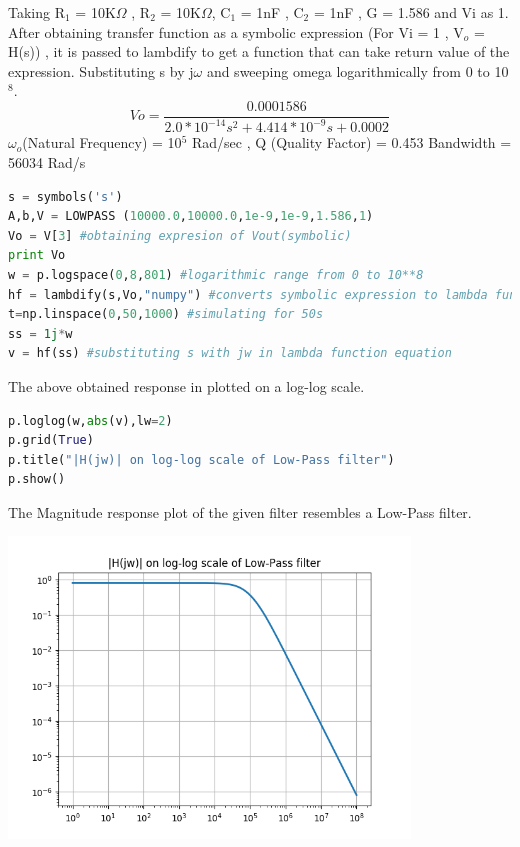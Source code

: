\documentclass[a4paper]{article}
\begin{document}
Taking R$_{1}$ = 10K$\Omega$ , R$_{2}$ = 10K$\Omega$, C$_{1}$ = 1nF , C$_{2}$ = 1nF , G = 1.586 and Vi as 1. After obtaining transfer function as a symbolic expression (For Vi = 1 , V$_{o}$ = H(s)) , it is passed to lambdify to get a function that can take return value of the expression. Substituting s by j$\omega$ and sweeping omega logarithmically from 0 to 10$^{8}$.
$$ Vo = \frac{0.0001586}{2.0*10^{-14}s^{2} + 4.414*10^{-9}s + 0.0002}$$
$\omega$$_{o}$(Natural Frequency) = 10$^{5}$ Rad/sec
, Q (Quality Factor) =  0.453
Bandwidth = 56034 Rad/s
\begin{lstlisting}[language=Python]
s = symbols('s')
A,b,V = LOWPASS	(10000.0,10000.0,1e-9,1e-9,1.586,1) 
Vo = V[3] #obtaining expresion of Vout(symbolic)
print Vo
w = p.logspace(0,8,801) #logarithmic range from 0 to 10**8
hf = lambdify(s,Vo,"numpy") #converts symbolic expression to lambda function
t=np.linspace(0,50,1000) #simulating for 50s
ss = 1j*w
v = hf(ss) #substituting s with jw in lambda function equation
\end{lstlisting}
The above obtained response in plotted on a log-log scale.
\begin{lstlisting}[language=Python]
p.loglog(w,abs(v),lw=2)	
p.grid(True)
p.title("|H(jw)| on log-log scale of Low-Pass filter")
p.show()
\end{lstlisting}
The Magnitude response plot of the given filter resembles a Low-Pass filter.
\begin{center}
\includegraphics[width=0.8\textwidth]{Figure_1.png}
\end{center}
\end{document}
